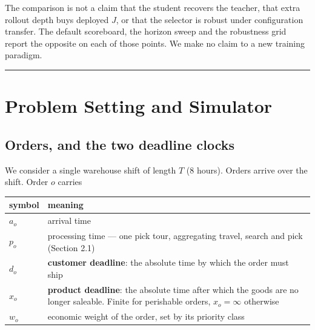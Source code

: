 \documentclass[review,3p,times]{elsarticle}
\newcounter{none}
\theoremstyle{definition}
\begin{document}
The comparison is not a claim that the student recovers the teacher,
that extra rollout depth buys deployed \(J\), or that the selector is
robust under configuration transfer. The default scoreboard, the horizon
sweep and the robustness grid report the opposite on each of those
points. We make no claim to a new training paradigm.

\begin{center}\rule{0.5\linewidth}{0.5pt}\end{center}

\section{Problem Setting and
Simulator}\label{problem-setting-and-simulator}

\subsection{Orders, and the two deadline
clocks}\label{orders-and-the-two-deadline-clocks}

We consider a single warehouse shift of length \(T\) (8 hours). Orders
arrive over the shift. Order \(o\) carries

{\def\LTcaptype{none} %
\begin{longtable}[]{@{}
  >{\raggedright\arraybackslash}p{}
  >{\raggedright\arraybackslash}p{}@{}}
\toprule\noalign{}
\begin{minipage}[b]{\linewidth}\raggedright
symbol
\end{minipage} & \begin{minipage}[b]{\linewidth}\raggedright
meaning
\end{minipage} \\
\midrule\noalign{}
\endhead
\bottomrule\noalign{}
\endlastfoot
\(a_o\) & arrival time \\
\(p_o\) & processing time --- one pick tour, aggregating travel, search
and pick (Section 2.1) \\
\(d_o\) & \textbf{customer deadline}: the absolute time by which the
order must ship \\
\(x_o\) & \textbf{product deadline}: the absolute time after which the
goods are no longer saleable. Finite for perishable orders,
\(x_o = \infty\) otherwise \\
\(w_o\) & economic weight of the order, set by its priority class \\
\end{longtable}
}
\end{document}
